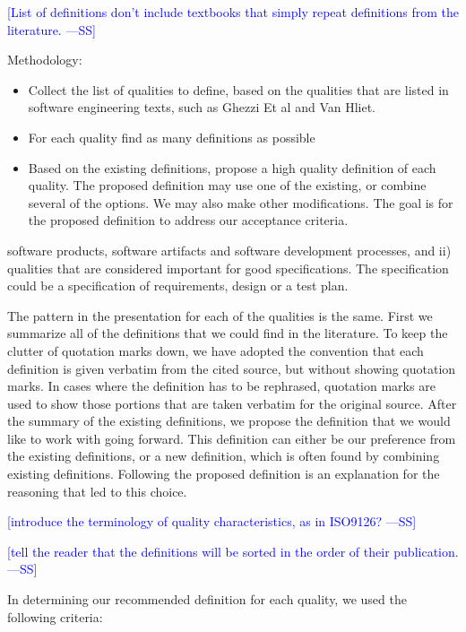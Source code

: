 \documentclass[letterpaper, cleveref]{lipics-v2019}
\newcommand{\authornote}[3]{\textcolor{#1}{[#3 ---#2]}}
\newcommand{\authornote}[3]{}
\newcommand{\wss}[1]{\authornote{blue}{SS}{#1}} %
\theoremstyle{definition}
\begin{document}
\wss{List of definitions don't include textbooks that simply repeat
definitions from the literature.}


Methodology:

\begin{itemize}

  \item Collect the list of qualities to define, based on the qualities that are
  listed in software engineering texts, such as Ghezzi Et al and Van Hliet.

  \item For each quality find as many definitions as possible

  \item Based on the existing definitions, propose a high quality definition of
  each quality.  The proposed definition may use one of the existing, or combine
  several of the options.  We may also make other modifications.  The goal is
  for the proposed definition to address our acceptance criteria.

\end{itemize}

software products, software artifacts and software development processes, and
ii) qualities that are considered important for good specifications.  The
specification could be a specification of requirements, design or a test plan.

The pattern in the presentation for each of the qualities is the same.  First we
summarize all of the definitions that we could find in the literature.  To keep
the clutter of quotation marks down, we have adopted the convention that each
definition is given verbatim from the cited source, but without showing
quotation marks.  In cases where the definition has to be rephrased, quotation
marks are used to show those portions that are taken verbatim for the original
source.  After the summary of the existing definitions, we propose the
definition that we would like to work with going forward.  This definition can
either be our preference from the existing definitions, or a new definition,
which is often found by combining existing definitions.  Following the proposed
definition is an explanation for the reasoning that led to this choice.

\wss{introduce the terminology of quality characteristics, as in ISO9126?}

\wss{tell the reader that the definitions will be sorted in the order of their
publication.}

In determining our recommended definition for each quality, we used the
following criteria:
\end{document}
